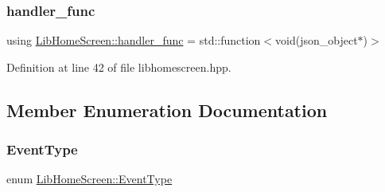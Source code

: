 \subsubsection{\texorpdfstring{handler\+\_\+func}{handler\_func}}
{\footnotesize\ttfamily using \hyperlink{class_lib_home_screen_a334f11f81c84c98d18284215dcaada3a}{Lib\+Home\+Screen\+::handler\+\_\+func} =  std\+::function$<$void(json\+\_\+object$\ast$)$>$}



Definition at line 42 of file libhomescreen.\+hpp.



\subsection{Member Enumeration Documentation}
\mbox{\label{class_lib_home_screen_a82616c91ac211d2ad08e709b524bf154}} 
\subsubsection{\texorpdfstring{Event\+Type}{EventType}}
{\footnotesize\ttfamily enum \hyperlink{class_lib_home_screen_a82616c91ac211d2ad08e709b524bf154}{Lib\+Home\+Screen\+::\+Event\+Type}}

